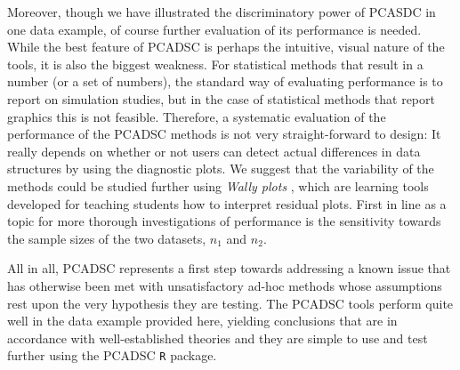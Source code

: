 \documentclass[titlepage,11pt,twoside]{article}
\begin{document}
Moreover, though we have illustrated the discriminatory power of PCASDC in one data example, of course further evaluation of its performance is needed.  
While the best feature of PCADSC is perhaps the intuitive, visual nature of the tools, it is also the biggest weakness. For statistical methods that result in a number (or a set of numbers), the standard way of evaluating performance is to report on simulation studies, but in the case of statistical methods that report graphics this is not feasible. Therefore, a systematic evaluation of the performance of the PCADSC methods is not very straight-forward to design: It really depends on whether or not users can detect actual differences in data structures by using the diagnostic plots. We suggest that the variability of the methods could be studied further using \textit{Wally plots} \citep{Ekstrøm2014}, which are learning tools developed for teaching students how to interpret residual plots. First in line as a topic for more thorough investigations of performance is the sensitivity towards the sample sizes of the two datasets, $n_1$ and $n_2$. 

All in all, PCADSC represents a first step towards addressing a known issue that has otherwise been met with unsatisfactory ad-hoc methods whose assumptions rest upon the very hypothesis they are testing. The PCADSC tools perform quite well in the data example provided here, yielding conclusions that are in accordance with well-established theories and they are simple to use and test further using the PCADSC \texttt{R} package. 






\appendix
\end{document}

